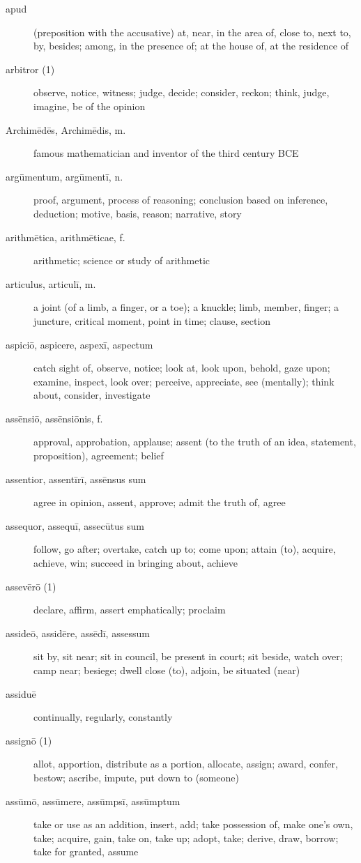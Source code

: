 \begin{description}
    \item[apud] (preposition with the accusative) at, near, in the area of, close to, next to, by, besides; among, in the presence of; at the house of, at the residence of
    \item[arbitror (1)] observe, notice, witness; judge, decide; consider, reckon; think, judge, imagine, be of the opinion
    \item[Archimēdēs, Archimēdis, m.] famous mathematician and inventor of the third century BCE
    \item[argūmentum, argūmentī, n.] proof, argument, process of reasoning; conclusion based on inference, deduction; motive, basis, reason; narrative, story
    \item[arithmētica, arithmēticae, f.] arithmetic; science or study of arithmetic
    \item[articulus, articulī, m.] a joint (of a limb, a finger, or a toe); a knuckle; limb, member, finger; a juncture, critical moment, point in time; clause, section
    \item[aspiciō, aspicere, aspexī, aspectum] catch sight of, observe, notice; look at, look upon, behold, gaze upon; examine, inspect, look over; perceive, appreciate, see (mentally); think about, consider, investigate
    \item[assēnsiō, assēnsiōnis, f.] approval, approbation, applause; assent (to the truth of an idea, statement, proposition), agreement; belief
    \item[assentior, assentīrī, assēnsus sum] agree in opinion, assent, approve; admit the truth of, agree
    \item[assequor, assequī, assecūtus sum] follow, go after; overtake, catch up to; come upon; attain (to), acquire, achieve, win; succeed in bringing about, achieve
    \item[assevērō (1)] declare, affirm, assert emphatically; proclaim
    \item[assideō, assidēre, assēdī, assessum] sit by, sit near; sit in council, be present in court; sit beside, watch over; camp near; besiege; dwell close (to), adjoin, be situated (near)
    \item[assiduē] continually, regularly, constantly
    \item[assignō (1)] allot, apportion, distribute as a portion, allocate, assign; award, confer, bestow; ascribe, impute, put down to (someone)
    \item[assūmō, assūmere, assūmpsī, assūmptum] take or use as an addition, insert, add; take possession of, make one's own, take; acquire, gain, take on, take up; adopt, take; derive, draw, borrow; take for granted, assume

\end{description}
